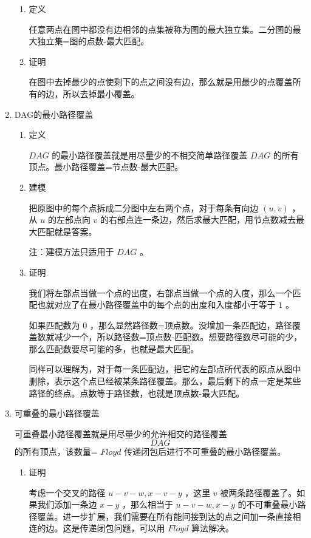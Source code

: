 \documentclass[11pt]{article}
\begin{document}
\begin{enumerate}
\begin{enumerate}
\item 定义
\label{sec-6-3-4-3-1}

任意两点在图中都没有边相邻的点集被称为图的最大独立集。二分图的最大独立集=图的点数-最大匹配。

\item 证明
\label{sec-6-3-4-3-2}

在图中去掉最少的点使剩下的点之间没有边，那么就是用最少的点覆盖所有的边，所以去掉最小覆盖。
\end{enumerate}

\item DAG的最小路径覆盖
\label{sec-6-3-4-4}

\begin{enumerate}
\item 定义
\label{sec-6-3-4-4-1}

$DAG$ 的最小路径覆盖就是用尽量少的不相交简单路径覆盖 $DAG$ 的所有顶点。最小路径覆盖=节点数-最大匹配。

\item 建模
\label{sec-6-3-4-4-2}

把原图中的每个点拆成二分图中左右两个点，对于每条有向边 $(u,v)$ ，从 $u$ 的左部点向 $v$ 的右部点连一条边，然后求最大匹配，用节点数减去最大匹配就是答案。

注：建模方法只适用于 $DAG$ 。

\item 证明
\label{sec-6-3-4-4-3}

我们将左部点当做一个点的出度，右部点当做一个点的入度，那么一个匹配也就对应了在最小路径覆盖中的每个点的出度和入度都小于等于 $1$ 。

如果匹配数为 $0$ ，那么显然路径数=顶点数。没增加一条匹配边，路径覆盖数就减少一个，所以路径数=顶点数-匹配数。想要路径数尽可能的少，那么匹配数要尽可能的多，也就是最大匹配。

同样可以理解为，对于每一条匹配边，把它的左部点所代表的原点从图中删除，表示这个点已经被某条路径覆盖。那么，最后剩下的点一定是某些路径的终点。点数等于路径数，也就是顶点数-最大匹配。
\end{enumerate}

\item 可重叠的最小路径覆盖
\label{sec-6-3-4-5}

可重叠最小路径覆盖就是用尽量少的允许相交的路径覆盖$$DAG$$的所有顶点，该数量= $Floyd$ 传递闭包后进行不可重叠的最小路径覆盖。

\begin{enumerate}
\item 证明
\label{sec-6-3-4-5-1}

考虑一个交叉的路径 $u-v-w,x-v-y$ ，这里 $v$ 被两条路径覆盖了。如果我们添加一条边 $x-y$ ，那么相当于 $u-v-w,x-y$ 的不可重叠最小路径覆盖。进一步扩展，我们需要在所有能间接到达的点之间加一条直接相连的边。这是传递闭包问题，可以用 $Floyd$ 算法解决。
\end{enumerate}
\end{enumerate}
\end{document}
